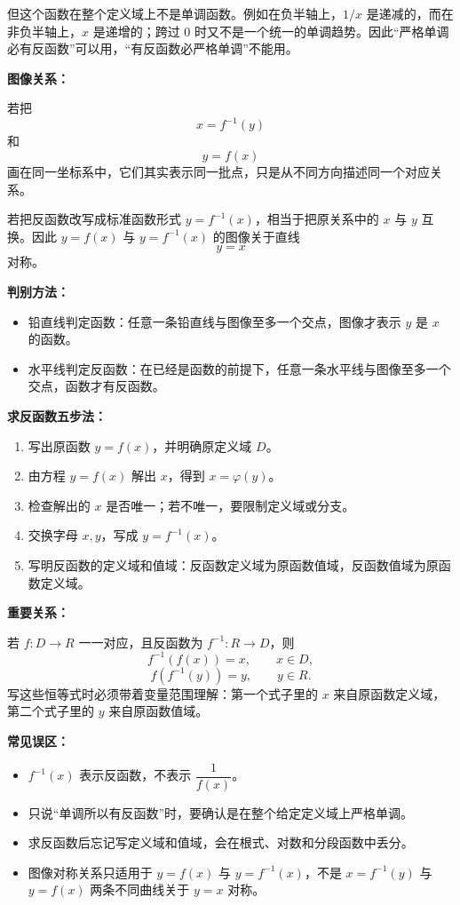 \begin{knowledgeBox}
但这个函数在整个定义域上不是单调函数。例如在负半轴上，\(1/x\) 是递减的，而在非负半轴上，\(x\) 是递增的；跨过 \(0\) 时又不是一个统一的单调趋势。因此“严格单调必有反函数”可以用，“有反函数必严格单调”不能用。

\textbf{图像关系：}

若把
\[
x=f^{-1}(y)
\]
和
\[
y=f(x)
\]
画在同一坐标系中，它们其实表示同一批点，只是从不同方向描述同一个对应关系。

若把反函数改写成标准函数形式 \(y=f^{-1}(x)\)，相当于把原关系中的 \(x\) 与 \(y\) 互换。因此 \(y=f(x)\) 与 \(y=f^{-1}(x)\) 的图像关于直线
\[
y=x
\]
对称。

\textbf{判别方法：}

\begin{itemize}
  \item 铅直线判定函数：任意一条铅直线与图像至多一个交点，图像才表示 \(y\) 是 \(x\) 的函数。
  \item 水平线判定反函数：在已经是函数的前提下，任意一条水平线与图像至多一个交点，函数才有反函数。
\end{itemize}

\textbf{求反函数五步法：}

\begin{enumerate}
  \item 写出原函数 \(y=f(x)\)，并明确原定义域 \(D\)。
  \item 由方程 \(y=f(x)\) 解出 \(x\)，得到 \(x=\varphi(y)\)。
  \item 检查解出的 \(x\) 是否唯一；若不唯一，要限制定义域或分支。
  \item 交换字母 \(x,y\)，写成 \(y=f^{-1}(x)\)。
  \item 写明反函数的定义域和值域：反函数定义域为原函数值域，反函数值域为原函数定义域。
\end{enumerate}

\textbf{重要关系：}

若 \(f:D\to R\) 一一对应，且反函数为 \(f^{-1}:R\to D\)，则
\[
f^{-1}(f(x))=x,\qquad x\in D,
\]
\[
f(f^{-1}(y))=y,\qquad y\in R.
\]
写这些恒等式时必须带着变量范围理解：第一个式子里的 \(x\) 来自原函数定义域，第二个式子里的 \(y\) 来自原函数值域。

\textbf{常见误区：}

\begin{itemize}
  \item \(f^{-1}(x)\) 表示反函数，不表示 \(\dfrac{1}{f(x)}\)。
  \item 只说“单调所以有反函数”时，要确认是在整个给定定义域上严格单调。
  \item 求反函数后忘记写定义域和值域，会在根式、对数和分段函数中丢分。
  \item 图像对称关系只适用于 \(y=f(x)\) 与 \(y=f^{-1}(x)\)，不是 \(x=f^{-1}(y)\) 与 \(y=f(x)\) 两条不同曲线关于 \(y=x\) 对称。
\end{itemize}
\end{knowledgeBox}

